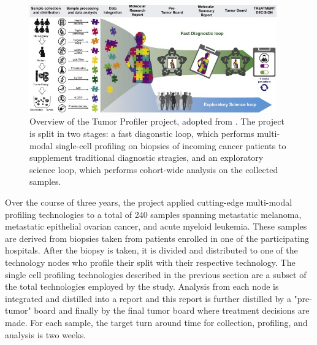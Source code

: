 \begin{figure}
  \begin{center}
    \includegraphics[width=0.95\textwidth]{figures/introduction/tupro.jpg}
  \end{center}
  \caption{Overview of the Tumor Profiler project, adopted from \cite{irmisch2020}. The project is split in two stages: a fast diagonstic loop, which performs multi-modal single-cell profiling on biopsies of incoming cancer patients to supplement traditional diagnostic stragies, and an exploratory science loop, which performs cohort-wide analysis on the collected samples.
  }\label{fig:tupro-overview}
\end{figure}

Over the course of three years, the project applied cutting-edge multi-modal profiling technologies to a total of 240 samples spanning metastatic melanoma, metastatic epithelial ovarian cancer, and acute myeloid leukemia.
These samples are derived from biopsies taken from patients enrolled in one of the participating hospitals.
After the biopsy is taken, it is divided and distributed to one of the technology nodes who profile their split with their respective technology.
The single cell profiling technologies described in the previous section are a subset of the total technologies employed by the study.
Analysis from each node is integrated and distilled into a report and 
this report is further distilled by a "pre-tumor" board and finally by the final tumor board where treatment decisions are made.
For each sample, the target turn around time for collection, profiling, and analysis is two weeks.


